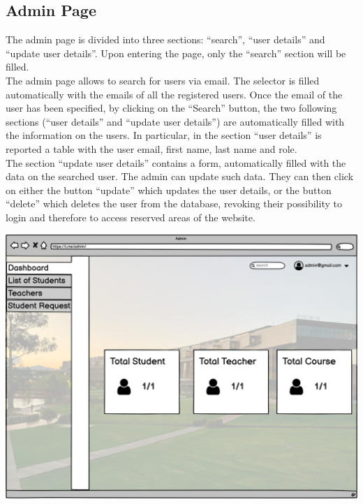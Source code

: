 \subsection{Admin Page}
The admin page is divided into three sections: “search”, “user details” and “update user details”. Upon
entering the page, only the “search” section will be filled.\\

The admin page allows to search for users via email. The selector is filled automatically with the emails
of all the registered users. Once the email of the user has been specified, by clicking on the “Search”
button, the two following sections (“user details” and “update user details”) are automatically filled with
the information on the users. In particular, in the section “user details” is reported a table with the user
email, first name, last name and role.\\ 

The section “update user details” contains a form, automatically filled with the data on the searched
user. The admin can update such data. They can then click on either the button “update” which
updates the user details, or the button “delete” which deletes the user from the database, revoking
their possibility to login and therefore to access reserved areas of the website.

\includegraphics[width=\columnwidth]{images/Admin Page.png}